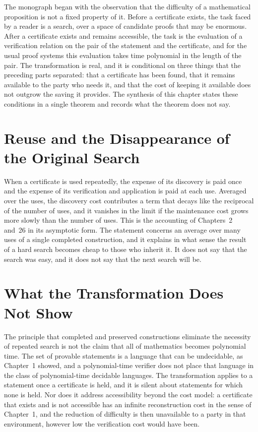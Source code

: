 \documentclass[11pt,letterpaper]{report}
\theoremstyle{plain}
\theoremstyle{definition}
\theoremstyle{remark}
\begin{document}
The monograph began with the observation that the difficulty of a mathematical proposition is not a fixed property of it. Before a certificate exists, the task faced by a reader is a search, over a space of candidate proofs that may be enormous. After a certificate exists and remains accessible, the task is the evaluation of a verification relation on the pair of the statement and the certificate, and for the usual proof systems this evaluation takes time polynomial in the length of the pair. The transformation is real, and it is conditional on three things that the preceding parts separated: that a certificate has been found, that it remains available to the party who needs it, and that the cost of keeping it available does not outgrow the saving it provides. The synthesis of this chapter states these conditions in a single theorem and records what the theorem does not say.

\section{Reuse and the Disappearance of the Original Search}

When a certificate is used repeatedly, the expense of its discovery is paid once and the expense of its verification and application is paid at each use. Averaged over the uses, the discovery cost contributes a term that decays like the reciprocal of the number of uses, and it vanishes in the limit if the maintenance cost grows more slowly than the number of uses. This is the accounting of Chapters~2 and~26 in its asymptotic form. The statement concerns an average over many uses of a single completed construction, and it explains in what sense the result of a hard search becomes cheap to those who inherit it. It does not say that the search was easy, and it does not say that the next search will be.

\section{What the Transformation Does Not Show}

The principle that completed and preserved constructions eliminate the necessity of repeated search is not the claim that all of mathematics becomes polynomial time. The set of provable statements is a language that can be undecidable, as Chapter~1 showed, and a polynomial-time verifier does not place that language in the class of polynomial-time decidable languages. The transformation applies to a statement once a certificate is held, and it is silent about statements for which none is held. Nor does it address accessibility beyond the cost model: a certificate that exists and is not accessible has an infinite reconstruction cost in the sense of Chapter~1, and the reduction of difficulty is then unavailable to a party in that environment, however low the verification cost would have been.
\end{document}
